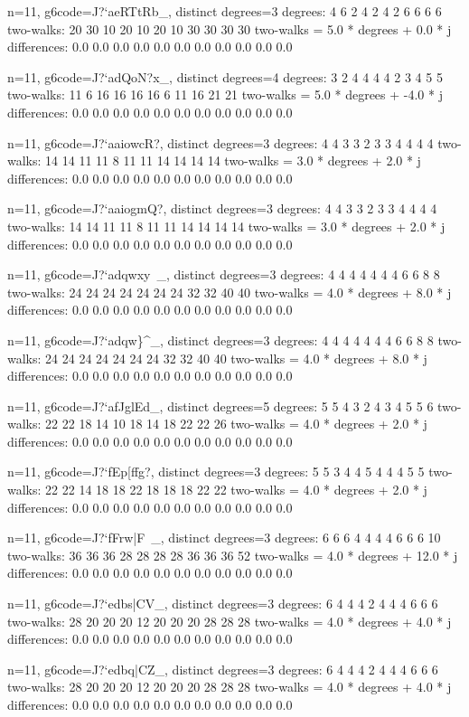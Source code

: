 {{{{{{{{{{{{{{{{{{n=11, g6code=J?`aeRTtRb_, distinct degrees=3
degrees: 4 6 2 4 2 4 2 6 6 6 6 
two-walks: 20 30 10 20 10 20 10 30 30 30 30 
two-walks = 5.0 * degrees + 0.0 * j
differences: 0.0 0.0 0.0 0.0 0.0 0.0 0.0 0.0 0.0 0.0 0.0 

n=11, g6code=J?`adQoN?x_, distinct degrees=4
degrees: 3 2 4 4 4 4 2 3 4 5 5 
two-walks: 11 6 16 16 16 16 6 11 16 21 21 
two-walks = 5.0 * degrees + -4.0 * j
differences: 0.0 0.0 0.0 0.0 0.0 0.0 0.0 0.0 0.0 0.0 0.0 

n=11, g6code=J?`aaiowcR?, distinct degrees=3
degrees: 4 4 3 3 2 3 3 4 4 4 4 
two-walks: 14 14 11 11 8 11 11 14 14 14 14 
two-walks = 3.0 * degrees + 2.0 * j
differences: 0.0 0.0 0.0 0.0 0.0 0.0 0.0 0.0 0.0 0.0 0.0 

n=11, g6code=J?`aaiogmQ?, distinct degrees=3
degrees: 4 4 3 3 2 3 3 4 4 4 4 
two-walks: 14 14 11 11 8 11 11 14 14 14 14 
two-walks = 3.0 * degrees + 2.0 * j
differences: 0.0 0.0 0.0 0.0 0.0 0.0 0.0 0.0 0.0 0.0 0.0 

n=11, g6code=J?`adqwxy~_, distinct degrees=3
degrees: 4 4 4 4 4 4 4 6 6 8 8 
two-walks: 24 24 24 24 24 24 24 32 32 40 40 
two-walks = 4.0 * degrees + 8.0 * j
differences: 0.0 0.0 0.0 0.0 0.0 0.0 0.0 0.0 0.0 0.0 0.0 

n=11, g6code=J?`adqw\}^_, distinct degrees=3
degrees: 4 4 4 4 4 4 4 6 6 8 8 
two-walks: 24 24 24 24 24 24 24 32 32 40 40 
two-walks = 4.0 * degrees + 8.0 * j
differences: 0.0 0.0 0.0 0.0 0.0 0.0 0.0 0.0 0.0 0.0 0.0 

n=11, g6code=J?`afJglEd_, distinct degrees=5
degrees: 5 5 4 3 2 4 3 4 5 5 6 
two-walks: 22 22 18 14 10 18 14 18 22 22 26 
two-walks = 4.0 * degrees + 2.0 * j
differences: 0.0 0.0 0.0 0.0 0.0 0.0 0.0 0.0 0.0 0.0 0.0 

n=11, g6code=J?`fEp[ffg?, distinct degrees=3
degrees: 5 5 3 4 4 5 4 4 4 5 5 
two-walks: 22 22 14 18 18 22 18 18 18 22 22 
two-walks = 4.0 * degrees + 2.0 * j
differences: 0.0 0.0 0.0 0.0 0.0 0.0 0.0 0.0 0.0 0.0 0.0 

n=11, g6code=J?`fFrw|F~_, distinct degrees=3
degrees: 6 6 6 4 4 4 4 6 6 6 10 
two-walks: 36 36 36 28 28 28 28 36 36 36 52 
two-walks = 4.0 * degrees + 12.0 * j
differences: 0.0 0.0 0.0 0.0 0.0 0.0 0.0 0.0 0.0 0.0 0.0 

n=11, g6code=J?`edbs|CV_, distinct degrees=3
degrees: 6 4 4 4 2 4 4 4 6 6 6 
two-walks: 28 20 20 20 12 20 20 20 28 28 28 
two-walks = 4.0 * degrees + 4.0 * j
differences: 0.0 0.0 0.0 0.0 0.0 0.0 0.0 0.0 0.0 0.0 0.0 

n=11, g6code=J?`edbq|CZ_, distinct degrees=3
degrees: 6 4 4 4 2 4 4 4 6 6 6 
two-walks: 28 20 20 20 12 20 20 20 28 28 28 
two-walks = 4.0 * degrees + 4.0 * j
differences: 0.0 0.0 0.0 0.0 0.0 0.0 0.0 0.0 0.0 0.0 0.0 

}}}}}}}}}}}}}}}}}}
